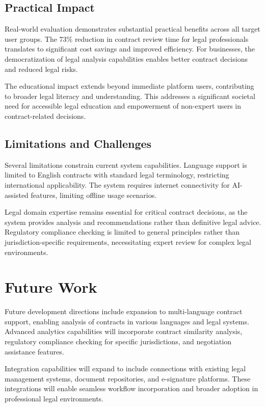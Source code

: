 \documentclass[conference]{IEEEtran}
\begin{document}
\subsection{Practical Impact}

Real-world evaluation demonstrates substantial practical benefits across all target user groups. The 73\% reduction in contract review time for legal professionals translates to significant cost savings and improved efficiency. For businesses, the democratization of legal analysis capabilities enables better contract decisions and reduced legal risks.

The educational impact extends beyond immediate platform users, contributing to broader legal literacy and understanding. This addresses a significant societal need for accessible legal education and empowerment of non-expert users in contract-related decisions.

\subsection{Limitations and Challenges}

Several limitations constrain current system capabilities. Language support is limited to English contracts with standard legal terminology, restricting international applicability. The system requires internet connectivity for AI-assisted features, limiting offline usage scenarios.

Legal domain expertise remains essential for critical contract decisions, as the system provides analysis and recommendations rather than definitive legal advice. Regulatory compliance checking is limited to general principles rather than jurisdiction-specific requirements, necessitating expert review for complex legal environments.

\section{Future Work}

Future development directions include expansion to multi-language contract support, enabling analysis of contracts in various languages and legal systems. Advanced analytics capabilities will incorporate contract similarity analysis, regulatory compliance checking for specific jurisdictions, and negotiation assistance features.

Integration capabilities will expand to include connections with existing legal management systems, document repositories, and e-signature platforms. These integrations will enable seamless workflow incorporation and broader adoption in professional legal environments.
\end{document}
